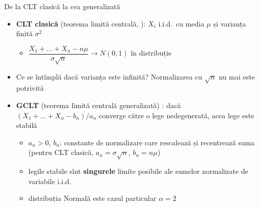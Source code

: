 \begin{frame}{De la CLT clasică la cea generalizată}
\itemsize{\small}
\begin{itemize}
    \item \textbf{CLT clasică} (teorema limită centrală, ): $X_i$ i.i.d.\ cu media $\mu$ și varianța finită $\sigma^2$
    \begin{itemize}
        \item $\dfrac{X_1 + \dots + X_n - n\mu}{\sigma\sqrt{n}} \to N(0, 1)$ în distribuție
    \end{itemize}
    \item Ce se întîmplă dacă varianța este infinită? Normalizarea cu $\sqrt{n}$ nu mai este potrivită
    \item \textbf{GCLT} (teorema limită centrală generalizată) : dacă $(X_1 + \dots + X_n - b_n)/a_n$ converge către o lege nedegenerată, acea lege este stabilă
    \begin{itemize}
        \item $a_n > 0$, $b_n$: constante de normalizare care rescalează și recentrează suma (pentru CLT clasică, $a_n = \sigma\sqrt{n}$, $b_n = n\mu$)
        \item legile stabile sînt \textbf{singurele} limite posibile ale sumelor normalizate de variabile i.i.d.
        \item distribuția Normală este cazul particular $\alpha = 2$
    \end{itemize}
\end{itemize}
\end{frame}

